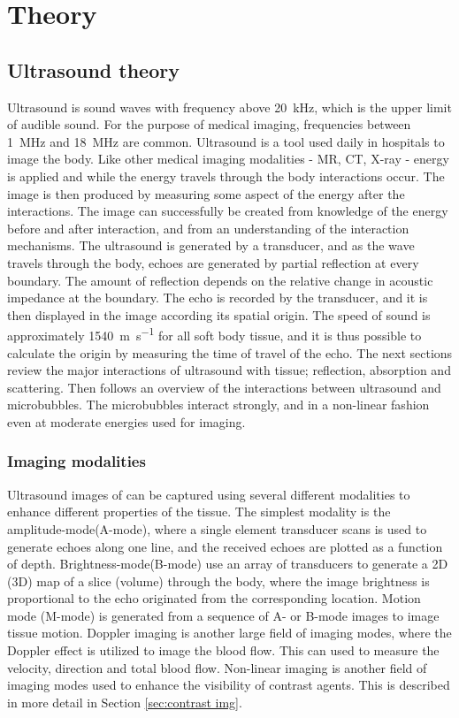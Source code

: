 \section{Theory}
\subsection{Ultrasound theory}
Ultrasound is sound waves with frequency above \SI{20}{\kilo\hertz}, which is the upper limit of audible sound. For the purpose of medical imaging, frequencies between \SI{1}{\mega\hertz} and \SI{18}{\mega\hertz} are common. Ultrasound is a tool used daily in hospitals to image the body. Like other medical imaging modalities - MR, CT, X-ray - energy is applied and while the energy travels through the body interactions occur. The image is then produced by measuring some aspect of the energy after the interactions. The image can successfully be created from knowledge of the energy before and after interaction, and from an understanding of the interaction mechanisms.
	 The ultrasound is generated by a transducer, and as the wave travels through the body, echoes are generated by partial reflection at every boundary. The amount of reflection depends on the relative change in acoustic impedance at the boundary. The echo is recorded by the transducer, and it is then displayed in the image according its spatial origin. The speed of sound is approximately \SI{1540}{\metre\per\second} for all soft body tissue, and it is thus possible to calculate the origin by measuring the time of travel of the echo. 
	 The next sections review the major interactions of ultrasound with tissue; reflection, absorption and scattering. Then follows an overview of the interactions between ultrasound and microbubbles. The microbubbles interact strongly, and in a non-linear fashion even at moderate energies used for imaging.

\subsubsection{Imaging modalities}
Ultrasound images of can be captured using several different modalities to enhance different properties of the tissue. The simplest modality is the amplitude-mode(A-mode), where a single element transducer scans is used to generate echoes along one line, and the received echoes are plotted as a function of depth. Brightness-mode(B-mode) use an array of transducers to generate a 2D (3D) map of a slice (volume) through the body, where the image brightness is proportional to the echo originated from the corresponding location. Motion mode (M-mode) is generated from a sequence of A- or B-mode images to image tissue motion. Doppler imaging is another large field of imaging modes, where the Doppler effect is utilized to image the blood flow. This can used to measure the velocity, direction and total blood flow. Non-linear imaging is another field of imaging modes used to enhance the visibility of contrast agents. This is described in more detail in Section \ref{sec:contrast img}.

